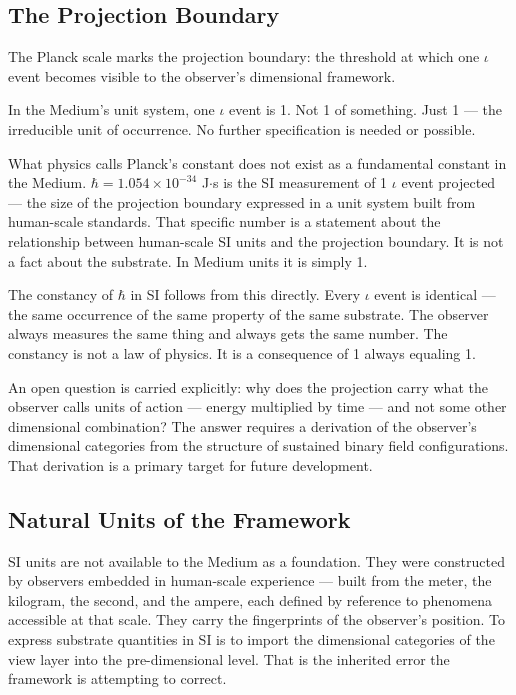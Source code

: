 \documentclass[11pt,letterpaper]{article}
\begin{document}
\subsection{The Projection Boundary}
\label{sec:org7995e57}

The Planck scale marks the projection boundary: the threshold at which one \(\iota\) event becomes visible to the observer's dimensional framework.

In the Medium's unit system, one \(\iota\) event is 1. Not 1 of something. Just 1 --- the irreducible unit of occurrence. No further specification is needed or possible.

What physics calls Planck's constant does not exist as a fundamental constant in the Medium. \(\hbar = 1.054 \times 10^{-34}\) J\(\cdot\)s is the SI measurement of 1 \(\iota\) event projected --- the size of the projection boundary expressed in a unit system built from human-scale standards. That specific number is a statement about the relationship between human-scale SI units and the projection boundary. It is not a fact about the substrate. In Medium units it is simply 1.

The constancy of \(\hbar\) in SI follows from this directly. Every \(\iota\) event is identical --- the same occurrence of the same property of the same substrate. The observer always measures the same thing and always gets the same number. The constancy is not a law of physics. It is a consequence of 1 always equaling 1.

An open question is carried explicitly: why does the projection carry what the observer calls units of action --- energy multiplied by time --- and not some other dimensional combination? The answer requires a derivation of the observer's dimensional categories from the structure of sustained binary field configurations. That derivation is a primary target for future development.

\subsection{Natural Units of the Framework}
\label{sec:org9ee14ec}

SI units are not available to the Medium as a foundation. They were constructed by observers embedded in human-scale experience --- built from the meter, the kilogram, the second, and the ampere, each defined by reference to phenomena accessible at that scale. They carry the fingerprints of the observer's position. To express substrate quantities in SI is to import the dimensional categories of the view layer into the pre-dimensional level. That is the inherited error the framework is attempting to correct.
\end{document}
